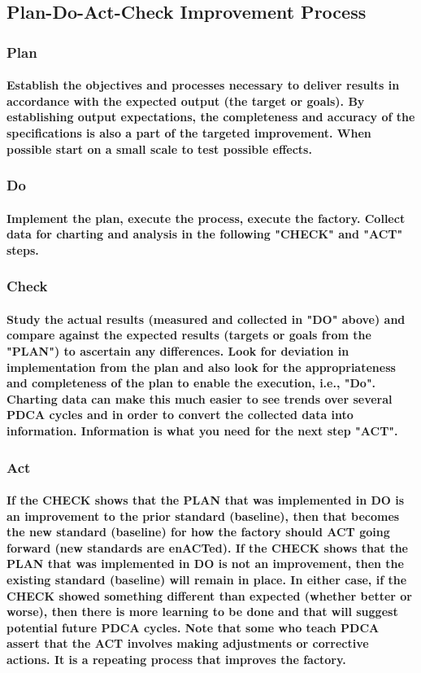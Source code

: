 \subsection{Plan-Do-Act-Check Improvement Process}
\subsubsection{Plan}
\paragraph{Establish the objectives and processes necessary to deliver results in accordance with the expected output (the target or goals). By establishing output expectations, the completeness and accuracy of the specifications is also a part of the targeted improvement. When possible start on a small scale to test possible effects.}
\subsubsection{Do}
\paragraph{Implement the plan, execute the process, execute the factory. Collect data for charting and analysis in the following "CHECK" and "ACT" steps.}
\subsubsection{Check}
\paragraph{Study the actual results (measured and collected in "DO" above) and compare against the expected results (targets or goals from the "PLAN") to ascertain any differences. Look for deviation in implementation from the plan and also look for the appropriateness and completeness of the plan to enable the execution, i.e., "Do". Charting data can make this much easier to see trends over several PDCA cycles and in order to convert the collected data into information. Information is what you need for the next step "ACT".}
\subsubsection{Act}
\paragraph{If the CHECK shows that the PLAN that was implemented in DO is an improvement to the prior standard (baseline), then that becomes the new standard (baseline) for how the factory should ACT going forward (new standards are enACTed). If the CHECK shows that the PLAN that was implemented in DO is not an improvement, then the existing standard (baseline) will remain in place. In either case, if the CHECK showed something different than expected (whether better or worse), then there is more learning to be done and that will suggest potential future PDCA cycles. Note that some who teach PDCA assert that the ACT involves making adjustments or corrective actions. It is a repeating process that improves the factory.}

